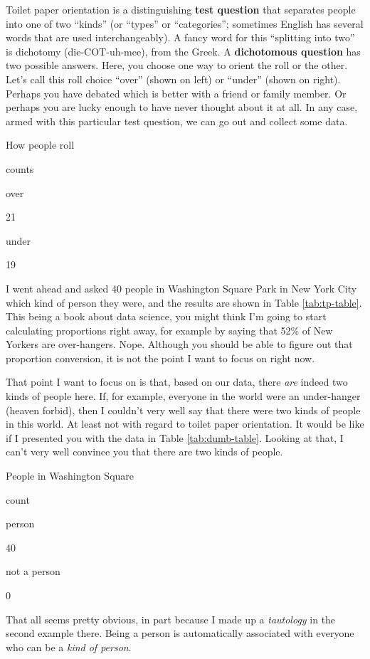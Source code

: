 \documentclass[]{book}
\begin{document}
Toilet paper orientation is a distinguishing \textbf{test question} that separates people into one of two ``kinds'' (or ``types'' or ``categories''; sometimes English has several words that are used interchangeably). A fancy word for this ``splitting into two'' is dichotomy (die-COT-uh-mee), from the Greek. A \textbf{dichotomous question} has two possible answers. Here, you choose one way to orient the roll or the other. Let's call this roll choice ``over'' (shown on left) or ``under'' (shown on right). Perhaps you have debated which is better with a friend or family member. Or perhaps you are lucky enough to have never thought about it at all. In any case, armed with this particular test question, we can go out and collect some data.

\label{tab:tp-table}How people roll

counts

over

21

under

19

I went ahead and asked 40 people in Washington Square Park in New York City which kind of person they were, and the results are shown in Table \ref{tab:tp-table}. This being a book about data science, you might think I'm going to start calculating proportions right away, for example by saying that 52\% of New Yorkers are over-hangers.
Nope. Although you should be able to figure out that proportion conversion, it is not the point I want to focus on right now.

That point I want to focus on is that, based on our data, there \emph{are} indeed two kinds of people here. If, for example, everyone in the world were an under-hanger (heaven forbid), then I couldn't very well say that there were two kinds of people in this world. At least not with regard to toilet paper orientation. It would be like if I presented you with the data in Table \ref{tab:dumb-table}. Looking at that, I can't very well convince you that there are two kinds of people.

\label{tab:dumb-table}People in Washington Square

count

person

40

not a person

0

That all seems pretty obvious, in part because I made up a \emph{tautology} in the second example there. Being a person is automatically associated with everyone who can be a \emph{kind of person}.
\end{document}
